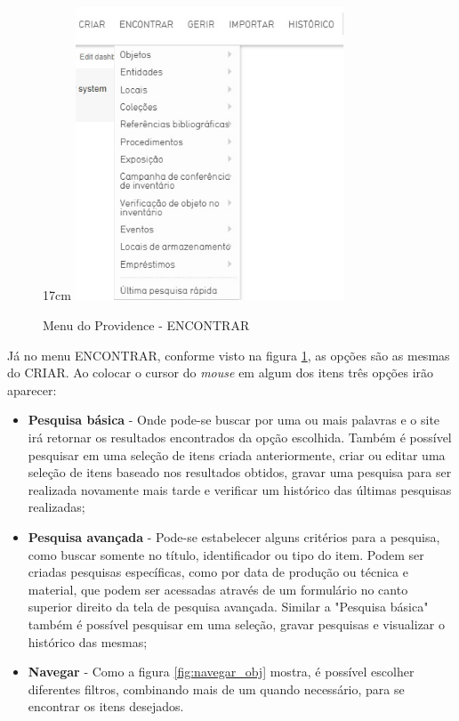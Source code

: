 \documentclass[a4paper,12pt,oneside,onecolumn,final,fleqn]{repUERJ}
\begin{document}
\begin{figure}[!ht]{17cm}
	\includegraphics[width=8cm, center]{figuras/menu_encontrar.jpg}
	\caption{Menu do Providence - ENCONTRAR} \label{fig:menu_encontrar}
\end{figure}

Já no menu ENCONTRAR, conforme visto na figura \ref{fig:menu_encontrar}, as opções são as mesmas do CRIAR. Ao colocar o cursor do \textit{mouse} em algum dos itens três opções irão aparecer: 

\begin{itemize}
	\item \textbf{Pesquisa básica} - Onde pode-se buscar por uma ou mais palavras e o site irá retornar os resultados encontrados da opção escolhida. Também é possível pesquisar em uma seleção de itens criada anteriormente, criar ou editar uma seleção de itens baseado nos resultados obtidos, gravar uma pesquisa para ser realizada novamente mais tarde e verificar um histórico das últimas pesquisas realizadas;
	\item \textbf{Pesquisa avançada} - Pode-se estabelecer alguns critérios para a pesquisa, como buscar somente no título, identificador ou tipo do item. Podem ser criadas pesquisas específicas, como por data de produção ou técnica e material, que podem ser acessadas através de um formulário no canto superior direito da tela de pesquisa avançada. Similar a "Pesquisa básica" também é possível pesquisar em uma seleção, gravar pesquisas e visualizar o histórico das mesmas;
	\item \textbf{Navegar} - Como a figura \ref{fig:navegar_obj} mostra, é possível escolher diferentes filtros, combinando mais de um quando necessário, para se encontrar os itens desejados.
\end{itemize}
\end{document}
